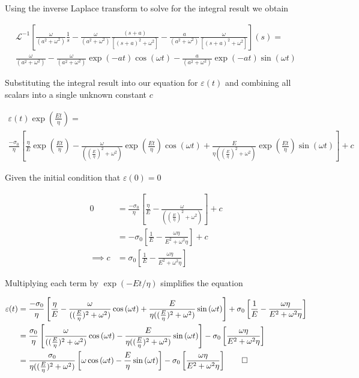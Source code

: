 Using the inverse Laplace transform to solve for the integral result we obtain

\begin{align*}
    \mathcal{L}^{-1}\left[\frac{\omega}{(a^2+\omega^2)}\frac{1}{s} - \frac{\omega}{(a^2+\omega^2)}\frac{(s+a)}{[(s+a)^2+\omega^2]} - \frac{a}{(a^2+\omega^2)}\frac{\omega
    }{[(s+a)^2+\omega^2]} \right](s) = \\\frac{\omega}{(a^2+\omega^2)} - \frac{\omega}{(a^2+\omega^2)} \exp{(-at)}\cos{(\omega t)} - \frac{a}{(a^2+\omega^2)}\exp{(-at)}\sin{(\omega t )}
\end{align*}

Substituting the integral result into our equation for $\varepsilon(t)$ and combining all scalars into a single unknown constant $c$ 

\begin{align*}
     \varepsilon(t)\exp{\left(\frac{Et}{\eta}\right)} = \\ \frac{-\sigma_0}{\eta} \left[ \frac{\eta}{E}\exp{\left(\frac{Et}{\eta}\right)} - \frac{\omega}{((\frac{E}{\eta})^2+\omega^2)} \exp{\left(\frac{Et}{\eta}\right)}\cos{(\omega t)} + \frac{E}{\eta((\frac{E}{\eta})^2+\omega^2)}\exp{\left(\frac{Et}{\eta}\right)}\sin{(\omega t )} \right] + c
\end{align*}

Given the initial condition that $\varepsilon(0) = 0$

\begin{align*}
    0 &= \frac{-\sigma_0}{\eta} \left[ \frac{\eta}{E} - \frac{\omega}{((\frac{E}{\eta})^2+\omega^2)} \right] + c \\
    &= -\sigma_0 \left[ \frac{1}{E} - \frac{\omega\eta}{E^2+\omega^2\eta} \right] + c \\
    \implies c &= \sigma_0 \left[ \frac{1}{E} - \frac{\omega\eta}{E^2+\omega^2\eta} \right]
\end{align*}

Multiplying each term by $\exp(-Et/\eta)$ simplifies the equation 

\begin{align*}
    \varepsilon(t) &= \frac{-\sigma_0}{\eta}\left[ \frac{\eta}{E} - \frac{\omega}{((\frac{E}{\eta})^2+\omega^2)}\cos{(\omega t)} + \frac{E}{\eta((\frac{E}{\eta})^2+\omega^2)}\sin{(\omega t)} \right] + \sigma_0 \left[ \frac{1}{E} - \frac{\omega\eta}{E^2+\omega^2\eta} \right]\\
    &= \frac{\sigma_0}{\eta}\left[\frac{\omega}{((\frac{E}{\eta})^2+\omega^2)}\cos{(\omega t)} - \frac{E}{\eta((\frac{E}{\eta})^2+\omega^2)}\sin{(\omega t)} \right] - \sigma_0 \left[\frac{\omega\eta}{E^2+\omega^2\eta} \right]\\
    &= \frac{\sigma_0}{\eta((\frac{E}{\eta})^2+\omega^2)}\left[\omega\cos{(\omega t)} - \frac{E}{\eta}\sin{(\omega t)} \right] - \sigma_0 \left[\frac{\omega\eta}{E^2+\omega^2\eta} \right] \qed \\
\end{align*}

